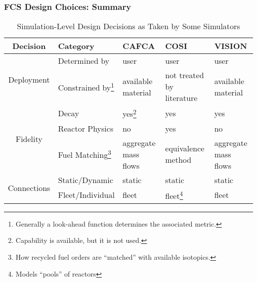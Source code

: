 \begin{frame}[ctb!]
  \frametitle{FCS Design Choices: Summary}

  \fontsize{7pt}{\baselineskip}\selectfont
  
  \begin{table} [h!]
    \begin{tabularx}{\textwidth}{|c|X|X|X|X|}
      \hline
      Decision                     & Category & CAFCA & COSI & VISION \\ 
      \hline
      \multirow{2}{*}{Deployment}  & Determined by 
      & user & user & user \\ \cline{2-5}
      & Constrained by\footnote{Generally a look-ahead function determines the associated metric.}   
      & available material & not treated by literature & available material \\ \hline
      \multirow{3}{*}{Fidelity}    & Decay 
      & yes\footnote{Capability is available, but it is not used.} & yes & yes \\ \cline{2-5}
      & Reactor Physics 
      & no & yes & no \\ \cline{2-5}
      & Fuel Matching\footnote{How recycled fuel orders are ``matched'' with available isotopics.} 
      & aggregate mass flows & equivalence method & aggregate mass flows \\ \hline
      \multirow{2}{*}{Connections} & Static/Dynamic 
      & static & static & static \\ \cline{2-5}
      & Fleet/Individual 
      & fleet & fleet\footnote{Models ``pools'' of reactors} & fleet \\
      \hline
    \end{tabularx}
    \caption{Simulation-Level Design Decisions as Taken by Some Simulators}
    \label{tab:sim-summary}
  \end{table}

\end{frame}
